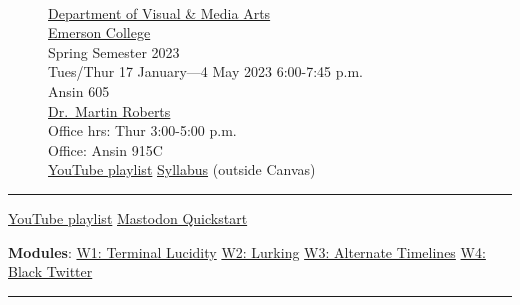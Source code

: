 \documentclass[
  letterpaper,
  DIV=11,
  numbers=noendperiod]{scrartcl}
\begin{document}
\begin{figure}
\begin{minipage}[t]{0.02\linewidth}
{\centering 

~

}

\end{minipage}%
%
\begin{minipage}[t]{0.49\linewidth}

{\centering 

\href{https://emerson.edu/academics/academic-departments/visual-media-arts}{Department
of Visual \& Media Arts}\\
\href{https://emerson.edu/}{Emerson College}\\
Spring Semester 2023\\
Tues/Thur 17 January---4 May 2023 6:00-7:45 p.m.\\
Ansin 605\\
\href{http://mroberts.emerson.build/}{Dr.~Martin Roberts}\\
Office hrs: Thur 3:00-5:00 p.m.\\
Office: Ansin 915C\\
\href{https://www.youtube.com/playlist?list=PL3uFXkpHLYM7Qmw6Bw1tdTG0Th7xhrVHF}{YouTube
playlist} \textbar{}
\href{https://mroberts1.github.io/digital-culture-sp23/}{Syllabus}
(outside Canvas)\\

}

\end{minipage}%

\end{figure}

\begin{center}\rule{0.5\linewidth}{0.5pt}\end{center}

\href{https://www.youtube.com/playlist?list=PL3uFXkpHLYM7Qmw6Bw1tdTG0Th7xhrVHF}{YouTube
playlist} \textbar{}
\href{https://canvas.emerson.edu/courses/1932613/pages/mastodon-quickstart}{Mastodon
Quickstart} \textbar~

\textbf{Modules}:
\href{https://canvas.emerson.edu/courses/1932613/pages/w1-terminal-lucidity}{W1:
Terminal Lucidity} \textbar{}
\href{https://canvas.emerson.edu/courses/1932613/pages/w2-lurking}{W2:
Lurking} \textbar{}
\href{https://canvas.emerson.edu/courses/1932613/pages/w3-alternate-timelines}{W3:
Alternate Timelines} \textbar{}
\href{https://canvas.emerson.edu/courses/1932613/pages/w4-black-twitter}{W4:
Black Twitter} \textbar{}

\begin{center}\rule{0.5\linewidth}{0.5pt}\end{center}
\end{document}
